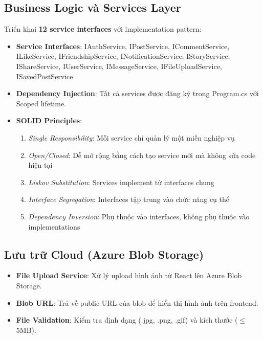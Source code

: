 \documentclass[a4paper]{article}
\begin{document}
    \subsection{Business Logic và Services Layer}
    Triển khai \textbf{12 service interfaces} với implementation pattern:
    \begin{itemize}
        \item \textbf{Service Interfaces}: IAuthService, IPostService, ICommentService, ILikeService, IFriendshipService, INotificationService, IStoryService, IShareService, IUserService, IMessageService, IFileUploadService, ISavedPostService
        \item \textbf{Dependency Injection}: Tất cả services được đăng ký trong Program.cs với Scoped lifetime.
        \item \textbf{SOLID Principles}: 
        \begin{enumerate}
            \item \textit{Single Responsibility}: Mỗi service chỉ quản lý một miền nghiệp vụ
            \item \textit{Open/Closed}: Dễ mở rộng bằng cách tạo service mới mà không sửa code hiện tại
            \item \textit{Liskov Substitution}: Services implement từ interfaces chung
            \item \textit{Interface Segregation}: Interfaces tập trung vào chức năng cụ thể
            \item \textit{Dependency Inversion}: Phụ thuộc vào interfaces, không phụ thuộc vào implementations
        \end{enumerate}
    \end{itemize}

    \subsection{Lưu trữ Cloud (Azure Blob Storage)}
    \begin{itemize}
        \item \textbf{File Upload Service}: Xử lý upload hình ảnh từ React lên Azure Blob Storage.
        \item \textbf{Blob URL}: Trả về public URL của blob để hiển thị hình ảnh trên frontend.
        \item \textbf{File Validation}: Kiểm tra định dạng (.jpg, .png, .gif) và kích thước ($\leq$ 5MB).
    \end{itemize}
\end{document}
